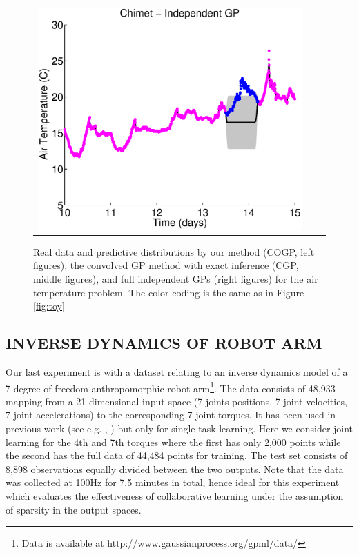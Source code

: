 \begin{figure}
\begin{tabular}{ccc}
\includegraphics[scale=0.3]{figures/weatherChimet.eps}
\end{tabular}
\caption{Real data and predictive distributions by our method (COGP, left figures), the convolved GP method with exact inference (CGP, middle figures), and full independent GPs (right figures) for the air temperature problem. The color coding is the same as in Figure \ref{fig:toy}}
\label{fig:weather}
\end{figure}

\subsection{INVERSE DYNAMICS OF ROBOT ARM}
Our last experiment is with a dataset relating to an inverse dynamics model of a 7-degree-of-freedom anthropomorphic robot arm\footnote{Data is available at http://www.gaussianprocess.org/gpml/data/}.
The data consists of 48,933 mapping from a 21-dimensional input space (7 joints positions, 7 joint velocities, 7 joint accelerations) to the corresponding 7 joint torques.
It has been used in previous work (see e.g. \citet{rasmussen-williams-book},  \citet{vijayakumar2000locally}) but only for single task learning.
Here we consider joint learning for the 4th and 7th torques where the first has only 2,000 points  while the second has the full data of 44,484 points for training.
The test set consists of 8,898 observations equally divided between the two outputs.
Note that the data was collected at 100Hz for 7.5 minutes in total, hence ideal for this experiment which evaluates the effectiveness of collaborative learning under the assumption of sparsity in the output spaces.

